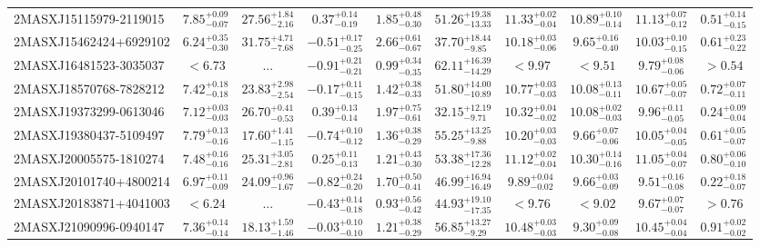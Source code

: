 \documentclass[onecolumn]{mn2e}
\begin{document}
\begin{landscape}
{\begin{center}
\begin{longtable}{lccccccccc}
2MASXJ15115979-2119015 & $7.85_{-0.07}^{+0.09}$ & $27.56_{-2.16}^{+1.84}$ & $0.37_{-0.19}^{+0.14}$ & $1.85_{-0.30}^{+0.48}$ &$51.26_{-13.33}^{+19.38}$ & $11.33_{-0.04}^{+0.02}$ & $10.89_{-0.14}^{+0.10}$ & $11.13_{-0.12}^{+0.07}$ & $0.51_{-0.15}^{+0.14}$ \\
2MASXJ15462424+6929102 & $6.24_{-0.30}^{+0.35}$ & $31.75_{-7.68}^{+4.71}$ & $-0.51_{-0.25}^{+0.17}$ & $2.66_{-0.67}^{+0.61}$ &$37.70_{-9.85}^{+18.44}$ & $10.18_{-0.06}^{+0.03}$ & $9.65_{-0.40}^{+0.16}$ & $10.03_{-0.15}^{+0.10}$ & $0.61_{-0.22}^{+0.23}$ \\
2MASXJ16481523-3035037 & $<6.73$ & ... & $-0.91_{-0.21}^{+0.21}$ & $0.99_{-0.35}^{+0.34}$ &$62.11_{-14.29}^{+16.39}$ & $<9.97$ & $<9.51$ & $9.79_{-0.06}^{+0.08}$ & $>0.54$ \\
2MASXJ18570768-7828212 & $7.42_{-0.18}^{+0.18}$ & $23.83_{-2.54}^{+2.98}$ & $-0.17_{-0.15}^{+0.11}$ & $1.42_{-0.33}^{+0.38}$ &$51.80_{-10.89}^{+14.00}$ & $10.77_{-0.03}^{+0.03}$ & $10.08_{-0.11}^{+0.13}$ & $10.67_{-0.07}^{+0.05}$ & $0.72_{-0.11}^{+0.07}$ \\
2MASXJ19373299-0613046 & $7.12_{-0.03}^{+0.03}$ & $26.70_{-0.53}^{+0.41}$ & $0.39_{-0.14}^{+0.13}$ & $1.97_{-0.61}^{+0.75}$ &$32.15_{-9.71}^{+12.19}$ & $10.32_{-0.02}^{+0.04}$ & $10.08_{-0.03}^{+0.02}$ & $9.96_{-0.05}^{+0.11}$ & $0.24_{-0.04}^{+0.09}$ \\
2MASXJ19380437-5109497 & $7.79_{-0.16}^{+0.13}$ & $17.60_{-1.15}^{+1.41}$ & $-0.74_{-0.12}^{+0.10}$ & $1.36_{-0.29}^{+0.38}$ &$55.25_{-9.88}^{+13.25}$ & $10.20_{-0.03}^{+0.03}$ & $9.66_{-0.06}^{+0.07}$ & $10.05_{-0.05}^{+0.04}$ & $0.61_{-0.07}^{+0.05}$ \\
2MASXJ20005575-1810274 & $7.48_{-0.16}^{+0.16}$ & $25.31_{-2.81}^{+3.05}$ & $0.25_{-0.13}^{+0.11}$ & $1.21_{-0.30}^{+0.43}$ &$53.38_{-12.28}^{+17.36}$ & $11.12_{-0.04}^{+0.02}$ & $10.30_{-0.16}^{+0.14}$ & $11.05_{-0.07}^{+0.04}$ & $0.80_{-0.10}^{+0.06}$ \\
2MASXJ20101740+4800214 & $6.97_{-0.09}^{+0.11}$ & $24.09_{-1.67}^{+0.96}$ & $-0.82_{-0.20}^{+0.24}$ & $1.70_{-0.41}^{+0.50}$ &$46.99_{-16.49}^{+16.94}$ & $9.89_{-0.02}^{+0.04}$ & $9.66_{-0.09}^{+0.03}$ & $9.51_{-0.08}^{+0.16}$ & $0.22_{-0.07}^{+0.18}$ \\
2MASXJ20183871+4041003 & $<6.24$ & ... & $-0.43_{-0.18}^{+0.14}$ & $0.93_{-0.42}^{+0.56}$ &$44.93_{-17.35}^{+19.10}$ & $<9.76$ & $<9.02$ & $9.67_{-0.07}^{+0.07}$ & $>0.76$ \\
2MASXJ21090996-0940147 & $7.36_{-0.14}^{+0.14}$ & $18.13_{-1.46}^{+1.59}$ & $-0.03_{-0.10}^{+0.10}$ & $1.21_{-0.29}^{+0.38}$ &$56.85_{-9.29}^{+13.27}$ & $10.48_{-0.03}^{+0.03}$ & $9.30_{-0.08}^{+0.09}$ & $10.45_{-0.04}^{+0.04}$ & $0.91_{-0.02}^{+0.02}$ \\

\end{longtable}
\end{center}}
\end{landscape}
\end{document}
